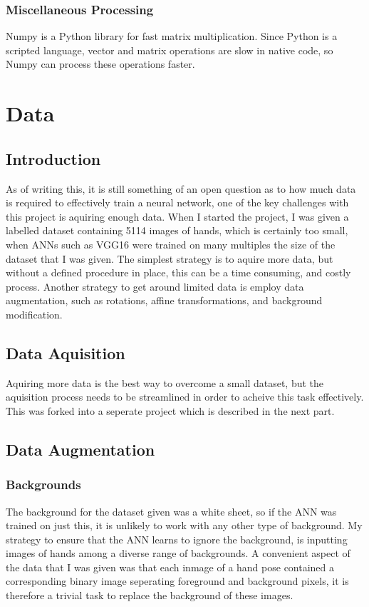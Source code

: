             \subsubsection{Miscellaneous Processing}
            Numpy is a Python library for fast matrix multiplication. Since Python is a scripted language, vector and matrix operations are slow in native code, so Numpy can process these operations faster.

    \section{Data}
        \subsection{Introduction}
        As of writing this, it is still something of an open question as to how much data is required to effectively train a neural network, one of the key challenges with this project is aquiring enough data. When I started the project, I was given a labelled dataset containing 5114 images of hands, which is certainly too small, when ANNs such as VGG16 \cite{vggnet} were trained on many multiples the size of the dataset that I was given. The simplest strategy is to aquire more data, but without a defined procedure in place, this can be a time consuming, and costly process. Another strategy to get around limited data is employ data augmentation, such as rotations, affine transformations, and background modification.

        \subsection{Data Aquisition}
        Aquiring more data is the best way to overcome a small dataset, but the aquisition process needs to be streamlined in order to acheive this task effectively. This was forked into a seperate project which is described in the next part.

        \subsection{Data Augmentation}
            \subsubsection{Backgrounds}
            The background for the dataset given was a white sheet, so if the ANN was trained on just this, it is unlikely to work with any other type of background. My strategy to ensure that the ANN learns to ignore the background, is inputting images of hands among a diverse range of backgrounds. A convenient aspect of the data that I was given was that each inmage of a hand pose contained a corresponding binary image seperating foreground and background pixels, it is therefore a trivial task to replace the background of these images.

